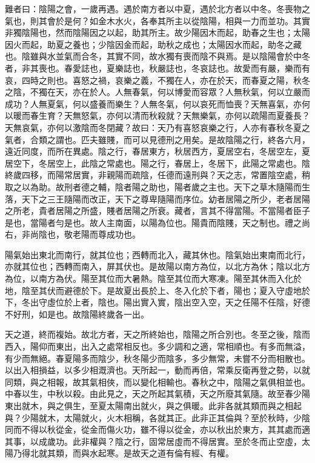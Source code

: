 
難者曰：陰陽之會，一歲再遇。遇於南方者以中夏，遇於北方者以中冬。冬喪物之氣也，則其會於是何？如金木水火，各奉其所主以從陰陽，相與一力而並功。其實非獨陰陽也，然而陰陽因之以起，助其所主。故少陽因木而起，助春之生也；太陽因火而起，助夏之養也；少陰因金而起，助秋之成也；太陽因水而起，助冬之藏也。陰雖與水並氣而合冬，其實不同，故水獨有喪而陰不與焉。是以陰陽會於中冬者，非其喪也。春愛誌也，夏樂誌也，秋嚴誌也，冬哀誌也。故愛而有嚴，樂而有哀，四時之則也。喜怒之禍，哀樂之義，不獨在人，亦在於天，而春夏之陽，秋冬之陰，不獨在天，亦在於人。人無春氣，何以博愛而容眾？人無秋氣，何以立嚴而成功？人無夏氣，何以盛養而樂生？人無冬氣，何以哀死而恤喪？天無喜氣，亦何以暖而春生育？天無怒氣，亦何以清而秋殺就？天無樂氣，亦何以疏陽而夏養長？天無哀氣，亦何以激陰而冬閉藏？故曰：天乃有喜怒哀樂之行，人亦有春秋冬夏之氣者，合類之謂也。匹夫雖賤，而可以見德刑之用矣。是故陰陽之行，終各六月，遠近同度，而所在異處。陰之行，春居東方，秋居西方，夏居空右，冬居空左，夏居空下，冬居空上，此陰之常處也。陽之行，春居上，冬居下，此陽之常處也。陰終歲四移，而陽常居實，非親陽而疏陰，任德而遠刑與？天之志，常置陰空處，稍取之以為助。故刑者德之輔，陰者陽之助也，陽者歲之主也。天下之草木隨陽而生落，天下之三王隨陽而改正，天下之尊卑隨陽而序位。幼者居陽之所少，老者居陽之所老，貴者居陽之所盛，賤者居陽之所衰。藏者，言其不得當陽。不當陽者臣子是也，當陽者勻是也。故人主南面，以陽為位也。陽貴而陰賤，天之制也。禮之尚右，非尚陰也，敬老陽而尊成功也。


陽氣始出東北而南行，就其位也；西轉而北入，藏其休也。陰氣始出東南而北行，亦就其位也；西轉而南入，屏其伏也。是故陽以南方為位，以北方為休；陰以北方為位，以南方為伏。陽至其位而大暑熱。陰至其位而大寒凍。陽至其休而入化於地，陰至其伏而避德於下。是故夏出長於上、冬入化於下者，陽也；夏入守虛地於下，冬出守虛位於上者，陰也。陽出實入實，陰出空入空，天之任陽不任陰，好德不好刑，如是也。故陰陽終歲各一出。


天之道，終而複始。故北方者，天之所終始也，陰陽之所合別也。冬至之後，陰而西入，陽仰而東出，出入之處常相反也。多少調和之適，常相順也。有多而無溢，有少而無絕。春夏陽多而陰少，秋冬陽少而陰多，多少無常，未嘗不分而相散也。以出入相損益，以多少相溉濟也。天所起一，動而再倍，常乘反衛再登之勢，以就同類，與之相報，故其氣相俠，而以變化相輸也。春秋之中，陰陽之氣俱相並也。中春以生，中秋以殺。由此見之，天之所起其氣積，天之所廢其氣隨。故至春少陽東出就木，與之俱生，至夏太陽南出就火，與之俱暖。此非各就其類而與之相起與？少陽就木，太陽就火，火木相稱，各就其正。此非正其倫與？至於秋時，少陰同而不得以秋從金，從金而傷火功，雖不得以從金，亦以秋出於東方，其其處而適其事，以成歲功。此非權與？陰之行，固常居虛而不得居實。至於冬而止空虛，太陽乃得北就其類，而與水起寒。是故天之道有倫有經、有權。

